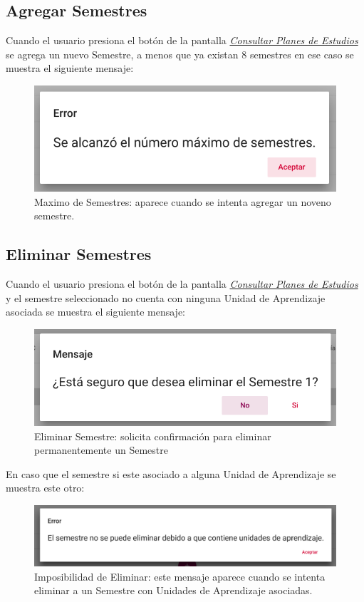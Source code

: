 \subsection{Agregar Semestres}
Cuando el usuario presiona el botón \IUbutton{+} de la pantalla \hyperlink{consultarS}{\textit{Consultar Planes de Estudios}} se agrega un nuevo Semestre, a menos que ya existan 8 semestres en ese caso se muestra el siguiente mensaje:
\begin{figure}[H]
    \centering
    \hypertarget{maxSemestres}{\includegraphics[width=0.7\linewidth]{images/GUA/maxSemestres}}
    \caption{Maximo de Semestres: aparece cuando se intenta agregar un noveno semestre.}
    \label{maxSemestres}
\end{figure}
\newpage
\subsection{Eliminar Semestres}
Cuando el usuario presiona el botón  de la pantalla \hyperlink{consultarS}{\textit{Consultar Planes de Estudios}} y el semestre seleccionado no cuenta con ninguna Unidad de Aprendizaje asociada se muestra el siguiente mensaje:
\begin{figure}[H]
    \centering
    \hypertarget{eliminarS}{\includegraphics[width=0.7\linewidth]{images/GUA/eliminarS}}
    \caption{Eliminar Semestre: solicita confirmación para eliminar permanentemente un Semestre}
    \label{eliminarS}
\end{figure}
En caso que el semestre si este asociado a alguna Unidad de Aprendizaje se muestra este otro:
\begin{figure}[H]
    \centering
    \hypertarget{errorEliminarS}{\includegraphics[width=0.7\linewidth]{images/GUA/errorEliminarS}}
    \caption{Imposibilidad de Eliminar: este mensaje aparece cuando se intenta eliminar a un Semestre con Unidades de Aprendizaje asociadas.}
    \label{errorEliminarS}
\end{figure}
\newpage
